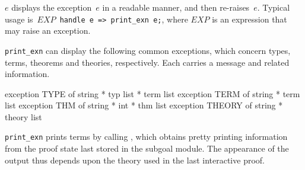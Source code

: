 \begin{ttdescription}
\item[\ttindexbold{print_exn} $e$] 
displays the exception~$e$ in a readable manner, and then re-raises~$e$.
Typical usage is~\hbox{\tt $EXP$ handle e => print_exn e;}, where
$EXP$ is an expression that may raise an exception.

{\tt print_exn} can display the following common exceptions, which concern
types, terms, theorems and theories, respectively.  Each carries a message
and related information.
\begin{ttbox} 
exception TYPE   of string * typ list * term list
exception TERM   of string * term list
exception THM    of string * int * thm list
exception THEORY of string * theory list
\end{ttbox}
\end{ttdescription}
\begin{warn}
  {\tt print_exn} prints terms by calling , which obtains
  pretty printing information from the proof state last stored in the
  subgoal module.  The appearance of the output thus depends upon the
  theory used in the last interactive proof.
\end{warn}

